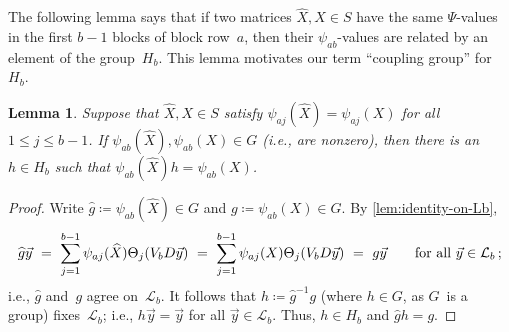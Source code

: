 \documentclass{lmcs}
\newtheorem{lemma}[thm]{Lemma}
\theoremstyle{definition}
\newcommand{\cL}{\mathcal{L}}
\begin{document}
The following lemma says that if two matrices $\widehat{X}, X \in S$ have the same $\Psi$-values in the first $b-1$ blocks of block row~$a$, then their $\psi_{a b}$-values are related by an element of the group~$H_b$.
This lemma motivates our term ``coupling group'' for~$H_b$.
\begin{lemma} \label{lem:ratio}
Suppose that $\widehat{X}, X \in S$ satisfy $\psi_{a j}(\widehat{X}) = \psi_{a j}(X)$ for all $1 \le j \le b-1$.
If $\psi_{a b}(\widehat{X}), \psi_{a b}(X) \in G$ (i.e., are nonzero), then there is an $h \in H_b$ such that $\psi_{a b}(\widehat{X}) h = \psi_{a b}(X)$.
\end{lemma}
\begin{proof}
Write $\widehat{g} \coloneqq \psi_{a b}(\widehat{X}) \in G$ and $g \coloneqq \psi_{a b}(X) \in G$.
By \cref{lem:identity-on-Lb},
\[
 \widehat{g} \vec{y} \ = \ \sum_{j=1}^{b-1} \psi_{a j}(\widehat{X}) \Theta_j(V_b D \vec{y}) \ = \ \sum_{j=1}^{b-1} \psi_{a j}(X) \Theta_j(V_b D \vec{y}) \ = \ g \vec{y} \qquad \text{for all $\vec{y} \in \cL_b$\,;}
\]
i.e., $\widehat{g}$ and~$g$ agree on~$\cL_b$.
It follows that $h \coloneqq \widehat{g}^{-1} g$ (where $h \in G$, as $G$~is a group) fixes~$\cL_b$; i.e., $h \vec{y} = \vec{y}$ for all $\vec{y} \in \cL_b$.
Thus, $h \in H_b$ and $\widehat{g} h = g$.
\end{proof}
\end{document}
